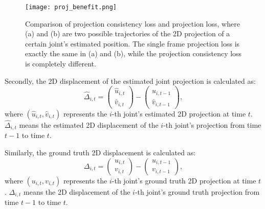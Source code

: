 \documentclass[journal]{IEEEtran}
\begin{document}
\begin{figure}[t]
	\centering
	\texttt{[image: proj\_benefit.png]}
	\vspace{-0pt}
	\caption{Comparison of projection consistency loss and projection loss, where (a) and (b) are two possible trajectories of the 2D projection of a certain joint's estimated position. The single frame projection loss is exactly the same in (a) and (b), while the projection consistency loss is completely different.} 
	\label{fig:proj benefit}
	\vspace{-0pt}
\end{figure}

Secondly, the 2D displacement of the estimated joint projection is calculated as:
\begin{equation}
	\hat{\Delta}_{i,t} = \left(
	\begin{matrix}
		\hat{u}_{i,t}\\
		\hat{v}_{i,t}
	\end{matrix}
	\right) - \left(
	\begin{matrix}
		\hat{u}_{i,t-1}\\
		\hat{v}_{i,t-1}
	\end{matrix}
	\right),
\end{equation}
where $(\hat{u}_{i,t}, \hat{v}_{i,t})$ represents the $i$-th joint's estimated 2D projection at time $t$. $\hat{\Delta}_{i,t}$ means the estimated 2D displacement of the $i$-th joint's projection from time $t-1$ to time $t$.\par 
Similarly, the ground truth 2D displacement is calculated as:
\begin{equation}
	\Delta_{i,t} = \left(
	\begin{matrix}
		u_{i,t}\\
		v_{i,t}
	\end{matrix}
	\right) - \left(
	\begin{matrix}
		u_{i,t-1}\\
		v_{i,t-1}
	\end{matrix}
	\right),
\end{equation}
where $(u_{i,t}, v_{i,t})$ represents the $i$-th joint's ground truth 2D projection at time $t$. $\Delta_{i,t}$ means the 2D displacement of the $i$-th joint's ground truth projection from time $t-1$ to time $t$.
\end{document}
